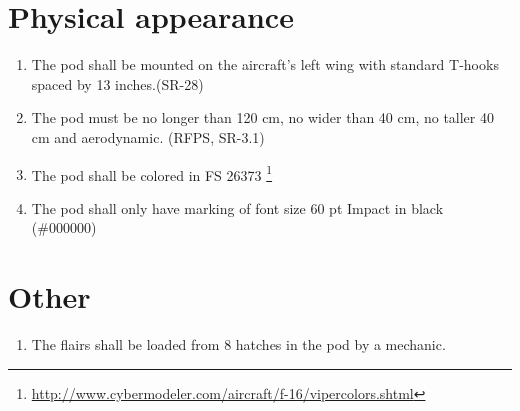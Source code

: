 \documentclass[Main]{subfiles}
\begin{document}
\section{Physical appearance}
\begin{enumerate}[resume*]

\item The pod shall be mounted on the aircraft's left wing with standard T-hooks spaced by 13 inches.(SR-28)

\item The pod must be no longer than 120 cm, no wider than 40 cm, no taller 40 cm and aerodynamic. (RFPS, SR-3.1)

\item The pod shall be colored in FS 26373 \footnote{\url{http://www.cybermodeler.com/aircraft/f-16/vipercolors.shtml}}

\item The pod shall only have marking of font size 60 pt Impact in black (\#000000)

\end{enumerate}


\section{Other}

\begin{enumerate}[resume*]

\item The flairs shall be loaded from 8 hatches in the pod by a mechanic.

\end{enumerate}
\end{document}
